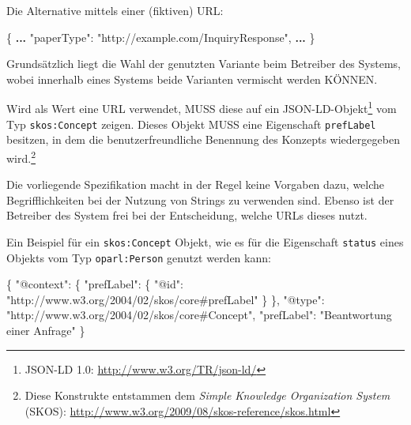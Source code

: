 \documentclass[,a4paper]{article}
\newenvironment{Shaded}{}{}
\newcommand{\DataTypeTok}[1]{\textcolor[rgb]{0.56,0.13,0.00}{{#1}}}
\newcommand{\StringTok}[1]{\textcolor[rgb]{0.25,0.44,0.63}{{#1}}}
\newcommand{\FunctionTok}[1]{\textcolor[rgb]{0.02,0.16,0.49}{{#1}}}
\newcommand{\ErrorTok}[1]{\textcolor[rgb]{1.00,0.00,0.00}{\textbf{{#1}}}}
\begin{document}
Die Alternative mittels einer (fiktiven) URL:

\begin{Shaded}
\begin{Highlighting}[]
\FunctionTok{\{}
    \ErrorTok{...}
    \DataTypeTok{"paperType"}\FunctionTok{:} \StringTok{"http://example.com/InquiryResponse"}\FunctionTok{,}
    \ErrorTok{...}
\FunctionTok{\}}
\end{Highlighting}
\end{Shaded}

Grundsätzlich liegt die Wahl der genutzten Variante beim Betreiber des
Systems, wobei innerhalb eines Systems beide Varianten vermischt werden
KÖNNEN.

Wird als Wert eine URL verwendet, MUSS diese auf ein
JSON-LD-Objekt\footnote{JSON-LD 1.0: \url{http://www.w3.org/TR/json-ld/}}
vom Typ \texttt{skos:Concept} zeigen. Dieses Objekt MUSS eine
Eigenschaft \texttt{prefLabel} besitzen, in dem die benutzerfreundliche
Benennung des Konzepts wiedergegeben wird.\footnote{Diese Konstrukte
  entstammen dem \emph{Simple Knowledge Organization System} (SKOS):
  \url{http://www.w3.org/2009/08/skos-reference/skos.html}}

Die vorliegende Spezifikation macht in der Regel keine Vorgaben dazu,
welche Begrifflichkeiten bei der Nutzung von Strings zu verwenden sind.
Ebenso ist der Betreiber des System frei bei der Entscheidung, welche
URLs dieses nutzt.

Ein Beispiel für ein \texttt{skos:Concept} Objekt, wie es für die
Eigenschaft \texttt{status} eines Objekts vom Typ \texttt{oparl:Person}
genutzt werden kann:

\begin{Shaded}
\begin{Highlighting}[]
\FunctionTok{\{}
    \DataTypeTok{"@context"}\FunctionTok{:} \FunctionTok{\{}
        \DataTypeTok{"prefLabel"}\FunctionTok{:} \FunctionTok{\{}
            \DataTypeTok{"@id"}\FunctionTok{:} \StringTok{"http://www.w3.org/2004/02/skos/core#prefLabel"}
        \FunctionTok{\}}
    \FunctionTok{\},}
    \DataTypeTok{"@type"}\FunctionTok{:} \StringTok{"http://www.w3.org/2004/02/skos/core#Concept"}\FunctionTok{,}
    \DataTypeTok{"prefLabel"}\FunctionTok{:} \StringTok{"Beantwortung einer Anfrage"}
\FunctionTok{\}}
\end{Highlighting}
\end{Shaded}
\end{document}
